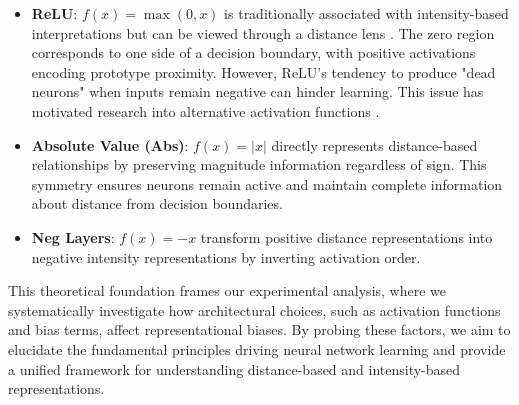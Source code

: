 \begin{itemize}
    \item \textbf{ReLU}: $f(x) = \max(0, x)$ is traditionally associated with intensity-based interpretations but can be viewed through a distance lens \cite{nair2010relu, glorot2011deep}. The zero region corresponds to one side of a decision boundary, with positive activations encoding prototype proximity. However, ReLU's tendency to produce "dead neurons" when inputs remain negative can hinder learning. This issue has motivated research into alternative activation functions \cite{he2015delving, ramachandran2017searching, misra2019mish}.
    
    \item \textbf{Absolute Value (Abs)}: $f(x) = |x|$ directly represents distance-based relationships by preserving magnitude information regardless of sign. This symmetry ensures neurons remain active and maintain complete information about distance from decision boundaries.
    
    \item \textbf{Neg Layers}: $f(x) = -x$ transform positive distance representations into negative intensity representations by inverting activation order.
\end{itemize}

This theoretical foundation frames our experimental analysis, where we systematically investigate how architectural choices, such as activation functions and bias terms, affect representational biases. By probing these factors, we aim to elucidate the fundamental principles driving neural network learning and provide a unified framework for understanding distance-based and intensity-based representations.
